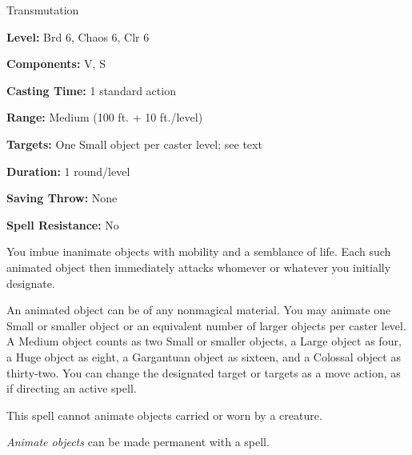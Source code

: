 
Transmutation

\textbf{Level:} Brd 6, Chaos 6, Clr 6

\textbf{Components:} V, S

\textbf{Casting Time:} 1 standard action

\textbf{Range:} Medium (100 ft. + 10 ft./level)

\textbf{Targets:} One Small object per caster level; see text

\textbf{Duration:} 1 round/level

\textbf{Saving Throw:} None

\textbf{Spell Resistance:} No

You imbue inanimate objects with mobility and a semblance of life. Each such animated 
object then immediately attacks whomever or whatever you initially designate.

An animated object can be of any nonmagical material. You may animate one Small 
or smaller object or an equivalent number of larger objects per caster level. A 
Medium object counts as two Small or smaller objects, a Large object as four, a 
Huge object as eight, a Gargantuan object as sixteen, and a Colossal object as 
thirty-two. You can change the designated target or targets as a move action, as 
if directing an active spell.

This spell cannot animate objects carried or worn by a creature.

\textit{Animate objects} can be made permanent with a  spell.

